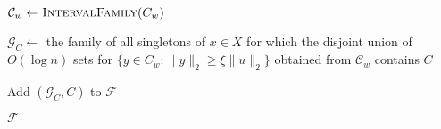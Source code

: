 \begin{algorithm}[!h]
\begin{algorithmic}[1]
        \EndIf
    
    \EndFor
    
    
    
        \State $\mathcal C_w\gets \textsc{IntervalFamily}(C_w)$
    
        
            \State $\mathcal G_C\gets$ the family of all singletons of $x\in X$ for which the disjoint union of $O(\log n)$ sets for $\{y\in C_w: \|y\|_2 \ge \xi \|u\|_2\}$ obtained from $\mathcal C_w$ contains $C$
        
            \State Add $(\mathcal G_C, C)$ to $\mathcal F$
        
        \EndFor
    
    \EndFor
    
    \Return $\mathcal F$
    
\EndProcedure
\end{algorithmic}
\end{algorithm}

